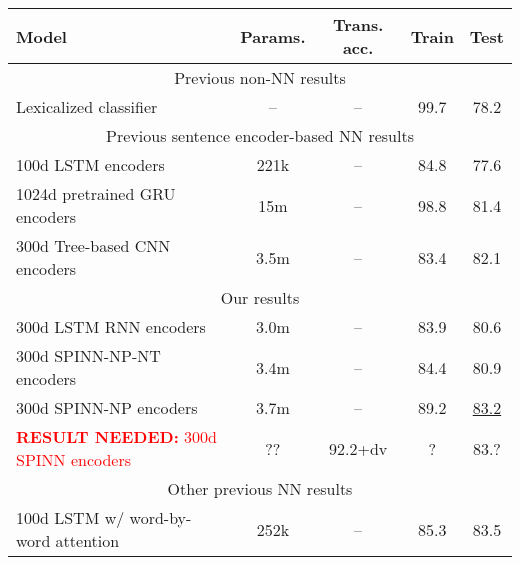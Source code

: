 \documentclass[11pt]{article}
\newcommand\result[1]{\textcolor{red}{\textbf{RESULT NEEDED:} #1}}
\begin{document}
\begin{table*}[t]
  \centering\small
  \begin{tabular}{lcccc} 
    \toprule
Model                   & Params.    & Trans. acc.  &   Train  &   Test \\
\midrule
\multicolumn{5}{c}{Previous non-NN results}\\
\midrule
Lexicalized classifier \citep{snli:emnlp2015}
                        & --                & --                    &   99.7   &   78.2      \\
\midrule
\multicolumn{5}{c}{Previous sentence encoder-based NN results}\\
\midrule
100d LSTM encoders \citep{snli:emnlp2015}
                        & 221k               & --               &   84.8   &   77.6      \\
1024d pretrained GRU encoders \citep{DBLP:journals/corr/VendrovKFU15}
                        & 15m                & --              &   98.8   &   81.4       \\
300d Tree-based CNN encoders \citep{mou2015recognizing}
                        & 3.5m                & --             &   83.4   &   82.1       \\
\midrule
\multicolumn{5}{c}{Our results}\\
\midrule
300d LSTM RNN encoders          & 3.0m                  & --                &   83.9      &   80.6       \\
300d SPINN-NP-NT encoders
                        & 3.4m                  & --                &   84.4      &   80.9       \\
300d SPINN-NP encoders
                        & 3.7m                  & --                &   89.2      &   \underline{83.2}       \\
\result{300d SPINN encoders }
                        & ??                  & 92.2+dv            &   ?    &   83.?      \\          
\midrule
\multicolumn{5}{c}{Other previous NN results}\\
\midrule
100d LSTM w/ word-by-word attention \citep{rocktaschel2015reasoning}
                        & 252k               & --              &   85.3   &   83.5       \\

\end{tabular}
\end{table*}
\end{document}
